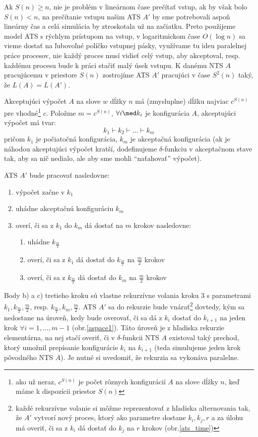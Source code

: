 \begin{dokaz}
Ak $S(n)\geq n$, nie je problém v lineárnom čase prečítať vstup,
ak by však bolo $S(n)<n$, na prečítanie vstupu našim ATS $A'$ by
sme potrebovali aspoň lineárny čas a celá simulácia by ztroskotala
už na začiatku. Preto použijeme model ATS s rýchlym prístupom na
vstup, v logaritmickom čase $O(\log n)$ sa vieme dostať na
ľubovoľné políčko vstupnej pásky, využívame tu ideu paralelnej
práce procesov, nie každý proces musí vidieť celý vstup, aby
akceptoval, resp. každému procesu bude k práci stačiť malý úsek
vstupu. K danému NTS $A$ pracujúcemu v priestore $S(n)$ zostrojíme
ATS $A'$ pracujúci v čase $S^2(n)$ taký, že $L(A)=L(A')$.

\smallskip
Akceptujúci výpočet $A$ na slove $w$ dĺžky $n$ má (zmysluplne)
dĺžku najviac $c^{S(n)}$ pre vhodné\footnote{ako už neraz,
$c^{S(n)}$ je počet rôznych konfigurácií $A$ na slove dĺžky $n$,
keď máme k dispozícii priestor $S(n)$} $c$. Položme $m=c^{S(n)}$,
$\forall i\med k_i$ je konfigurácia $A$, akceptujúci výpočet má
tvar:
\[
k_1\vdash k_2\vdash\dots\vdash k_m
\]
pričom $k_1$ je počiatočná konfigurácia, $k_m$ je akceptačná
konfigurácia (ak je náhodou akceptujúci výpočet kratší,
dodefinujeme $\delta$-funkciu v akceptačnom stave tak, aby sa nič
nedialo, ale aby sme mohli ``naťahovať'' výpočet).

\smallskip
ATS $A'$ bude pracovať nasledovne:
\begin{enumerate}
\item výpočet začne v $k_1$
\item uhádne akceptačnú konfiguráciu $k_m$
\item overí, či sa z $k_1$ do $k_m$ dá dostať na $m$ krokov
nasledovne:
\begin{enumerate}
\item uhádne $k_{\frac{m}{2}}$
\item overí, či sa z $k_1$ dá dostať do $k_{\frac{m}{2}}$ na $\frac{m}{2}$
krokov
\item overí, či sa z $k_{\frac{m}{2}}$ dá dostať do $k_m$ na $\frac{m}{2}$
krokov
\end{enumerate}
\end{enumerate}
Body b) a c) tretieho kroku sú vlastne rekurzívne volania kroku 3
s parametrami $k_1,k_{\frac{m}{2}},\frac{m}{2}$, resp.
$k_{\frac{m}{2}},k_m,\frac{m}{2}$. ATS $A'$ sa do rekurzie bude
vnárať\footnote{každé rekurzívne volanie si môžme reprezentovať z
hľadiska alternovania tak, že $A'$ vytvorí nový proces, ktorý ako
parametre dostane $k_i,k_j,r$ a za úlohu má overiť, či sa z $k_i$
dá dostať do $k_j$ na $r$ krokov (obr.\ref{ats_time})} dovtedy,
kým sa nedostane na úroveň, kedy bude overovať, či sa dá z $k_i$
dostať do $k_{i+1}$ na jeden krok $\forall i=1,\dots,m-1$
(obr.\ref{aspace1}). Táto úroveň je z hľadiska rekurzie
elementárna, na nej stačí overiť, či v $\delta$-funkcii NTS $A$
existoval taký prechod, ktorý umožnil prepísanie konfigurácie
$k_i$ na $k_{i+1}$ (teda simulujeme jeden krok pôvodného NTS $A$).
Je nutné si uvedomiť, že rekurzia sa vykonáva paralelne.


\end{dokaz}
